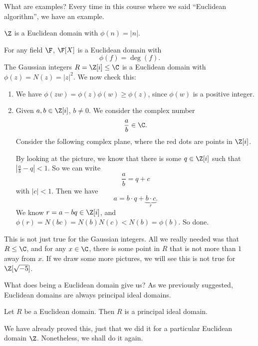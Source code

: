 \documentclass[a4paper]{article}
\begin{document}
What are examples? Every time in this course where we said ``Euclidean algorithm'', we have an example.
\begin{eg}
  $\Z$ is a Euclidean domain with $\phi(n) = |n|$.

  For any field $\F$, $\F[X]$ is a Euclidean domain with
  \[
    \phi(f) = \deg(f).
  \]
  The Gaussian integers $R = \Z[i] \leq \C$ is a Euclidean domain with $\phi(z) = N(z) = |z|^2$. We now check this:
  \begin{enumerate}
    \item We have $\phi(zw) = \phi(z)\phi(w) \geq \phi(z)$, since $\phi(w)$ is a positive integer.
    \item Given $a, b\in \Z[i]$, $b\not= 0$. We consider the complex number
      \[
        \frac{a}{b} \in \C.
      \]
      Consider the following complex plane, where the red dots are points in $\Z[i]$.
      \begin{center}
      \end{center}
      By looking at the picture, we know that there is some $q \in \Z[i]$ such that $\left|\frac{a}{b} - q\right| < 1$. So we can write
      \[
        \frac{a}{b} = q + c
      \]
      with $|c| < 1$. Then we have
      \[
        a = b\cdot q + \underbrace{b\cdot c}_r.
      \]
      We know $r = a - bq \in \Z[i]$, and $\phi(r) = N(bc) = N(b)N(c) < N(b) = \phi(b)$. So done.
  \end{enumerate}
  This is not just true for the Gaussian integers. All we really needed was that $R \leq \C$, and for any $x \in \C$, there is some point in $R$ that is not more than $1$ away from $x$. If we draw some more pictures, we will see this is not true for $\Z[\sqrt{-5}]$.
\end{eg}

What does being a Euclidean domain give us? As we previously suggested, Euclidean domains are always principal ideal domains.
\begin{prop}
  Let $R$ be a Euclidean domain. Then $R$ is a principal ideal domain.
\end{prop}
We have already proved this, just that we did it for a particular Euclidean domain $\Z$. Nonetheless, we shall do it again.
\end{document}
